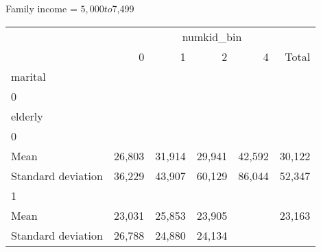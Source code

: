 Family income = $5,000 to $7,499
\begin{tabular}{llllll}
\cline{1-6}
\multicolumn{1}{c}{} &
  \multicolumn{5}{|c}{numkid\_bin} \\
\multicolumn{1}{c}{} &
  \multicolumn{1}{|r}{0} &
  \multicolumn{1}{r}{1} &
  \multicolumn{1}{r}{2} &
  \multicolumn{1}{r}{4} &
  \multicolumn{1}{r}{Total} \\
\cline{1-6}
\multicolumn{1}{l}{marital} &
  \multicolumn{1}{|r}{} &
  \multicolumn{1}{r}{} &
  \multicolumn{1}{r}{} &
  \multicolumn{1}{r}{} &
  \multicolumn{1}{r}{} \\
\multicolumn{1}{l}{\hspace{1em}0} &
  \multicolumn{1}{|r}{} &
  \multicolumn{1}{r}{} &
  \multicolumn{1}{r}{} &
  \multicolumn{1}{r}{} &
  \multicolumn{1}{r}{} \\
\multicolumn{1}{l}{\hspace{2em}elderly} &
  \multicolumn{1}{|r}{} &
  \multicolumn{1}{r}{} &
  \multicolumn{1}{r}{} &
  \multicolumn{1}{r}{} &
  \multicolumn{1}{r}{} \\
\multicolumn{1}{l}{\hspace{3em}0} &
  \multicolumn{1}{|r}{} &
  \multicolumn{1}{r}{} &
  \multicolumn{1}{r}{} &
  \multicolumn{1}{r}{} &
  \multicolumn{1}{r}{} \\
\multicolumn{1}{l}{\hspace{4em}Mean} &
  \multicolumn{1}{|r}{26,803} &
  \multicolumn{1}{r}{31,914} &
  \multicolumn{1}{r}{29,941} &
  \multicolumn{1}{r}{42,592} &
  \multicolumn{1}{r}{30,122} \\
\multicolumn{1}{l}{\hspace{4em}Standard deviation} &
  \multicolumn{1}{|r}{36,229} &
  \multicolumn{1}{r}{43,907} &
  \multicolumn{1}{r}{60,129} &
  \multicolumn{1}{r}{86,044} &
  \multicolumn{1}{r}{52,347} \\
\multicolumn{1}{l}{\hspace{3em}1} &
  \multicolumn{1}{|r}{} &
  \multicolumn{1}{r}{} &
  \multicolumn{1}{r}{} &
  \multicolumn{1}{r}{} &
  \multicolumn{1}{r}{} \\
\multicolumn{1}{l}{\hspace{4em}Mean} &
  \multicolumn{1}{|r}{23,031} &
  \multicolumn{1}{r}{25,853} &
  \multicolumn{1}{r}{23,905} &
  \multicolumn{1}{r}{} &
  \multicolumn{1}{r}{23,163} \\
\multicolumn{1}{l}{\hspace{4em}Standard deviation} &
  \multicolumn{1}{|r}{26,788} &
  \multicolumn{1}{r}{24,880} &
  \multicolumn{1}{r}{24,134} &

\end{tabular}
